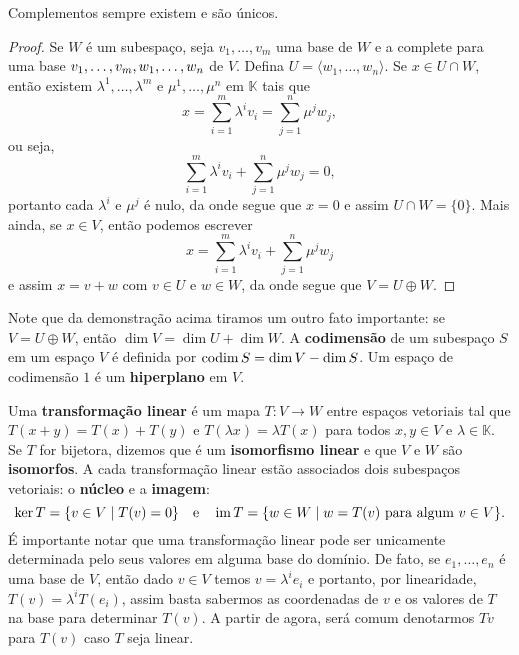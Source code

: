 \begin{theorem}
    Complementos sempre existem e são únicos.
\end{theorem}
\begin{proof}
    Se $W$ é um subespaço, seja $v_1, \dots, v_m$ uma base de $W$ e a complete para uma base $v_1, \dots, v_m, \\w_1, \dots, w_n$ de $V$. Defina $U = \langle w_1, \dots, w_n \rangle$. Se $x \in U \cap W$, então existem $\lambda^1, \dots, \lambda^m$ e $\mu^1, \dots, \mu^n$ em $\mathbb{K}$ tais que \begin{equation}
        x = \sum_{i = 1}^m \lambda^i v_i = \sum_{j = 1}^n \mu^j w_j,
    \end{equation}
    ou seja, \begin{equation}
        \sum_{i = 1}^m \lambda^i v_i + \sum_{j = 1}^n \mu^j w_j = 0,
    \end{equation} portanto cada $\lambda^i$ e $\mu^j$ é nulo, da onde segue que $x = 0$ e assim $U \cap W = \{0\}$. Mais ainda, se $x \in V$, então podemos escrever \begin{equation}
        x = \sum_{i = 1}^m \lambda^i v_i + \sum_{j = 1}^n \mu^j w_j
    \end{equation} e assim $x = v + w$ com $v \in U$ e $w \in W$, da onde segue que $V = U \oplus W$.
\end{proof}

Note que da demonstração acima tiramos um outro fato importante: se $V = U \oplus W$, então $\dim V = \dim U + \dim W$. A \textbf{codimensão} de um subespaço $S$ em um espaço $V$ é definida por $\operatorname{codim} S = \dim V - \dim S$. Um espaço de codimensão $1$ é um \textbf{hiperplano} em $V$.

Uma \textbf{transformação linear} é um mapa $T \colon V \to W$ entre espaços vetoriais tal que $T(x + y) = T(x) + T(y)$ e $T(\lambda x) = \lambda T(x)$ para todos $x, y \in V$ e $\lambda \in \mathbb{K}$. Se $T$ for bijetora, dizemos que é um \textbf{isomorfismo linear} e que $V$ e $W$ são \textbf{isomorfos}. A cada transformação linear estão associados dois subespaços vetoriais: o \textbf{núcleo} e a \textbf{imagem}: \begin{equation}
    \ker T = \{v \in V \mid T(v) = 0\} \quad \text{e} \quad \operatorname{im} T = \{w \in W \mid w = T(v) \text{ para algum } v \in V\}.
\end{equation} É importante notar que uma transformação linear pode ser unicamente determinada pelo seus valores em alguma base do domínio. De fato, se $e_1, \dots, e_n$ é uma base de $V$, então dado $v \in V$ temos $v = \lambda^i e_i$ e portanto, por linearidade, $T(v) = \lambda^i T(e_i)$, assim basta sabermos as coordenadas de $v$ e os valores de $T$ na base para determinar $T(v)$. A partir de agora, será comum denotarmos $Tv$ para $T(v)$ caso $T$ seja linear.

